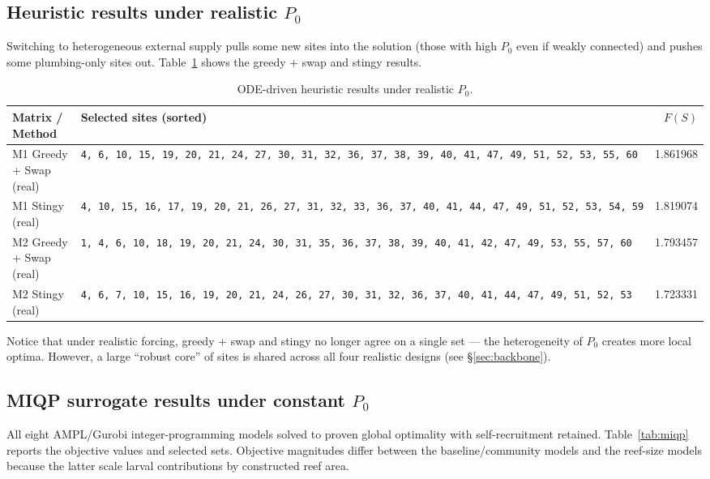 \documentclass[11pt]{article}
\begin{document}
\subsection{Heuristic results under realistic \texorpdfstring{$P_0$}{P0}}

Switching to heterogeneous external supply pulls some new sites into the solution (those with high $P_0$ even if weakly connected) and pushes some plumbing-only sites out. Table~\ref{tab:heur-real} shows the greedy + swap and stingy results.

\begin{table}[H]
\centering
\caption{ODE-driven heuristic results under realistic $P_0$.}
\label{tab:heur-real}
\small
\begin{tabularx}{\linewidth}{@{}l X r@{}}
\toprule
\textbf{Matrix / Method} & \textbf{Selected sites (sorted)} & \textbf{$F(S)$} \\
\midrule
M1 Greedy + Swap (real) & \texttt{4,\ 6,\ 10,\ 15,\ 19,\ 20,\ 21,\ 24,\ 27,\ 30,\ 31,\ 32,\ 36,\ 37,\ 38,\ 39,\ 40,\ 41,\ 47,\ 49,\ 51,\ 52,\ 53,\ 55,\ 60} & 1.861968 \\
M1 Stingy (real) & \texttt{4,\ 10,\ 15,\ 16,\ 17,\ 19,\ 20,\ 21,\ 26,\ 27,\ 31,\ 32,\ 33,\ 36,\ 37,\ 40,\ 41,\ 44,\ 47,\ 49,\ 51,\ 52,\ 53,\ 54,\ 59} & 1.819074 \\
\midrule
M2 Greedy + Swap (real) & \texttt{1,\ 4,\ 6,\ 10,\ 18,\ 19,\ 20,\ 21,\ 24,\ 30,\ 31,\ 35,\ 36,\ 37,\ 38,\ 39,\ 40,\ 41,\ 42,\ 47,\ 49,\ 53,\ 55,\ 57,\ 60} & 1.793457 \\
M2 Stingy (real) & \texttt{4,\ 6,\ 7,\ 10,\ 15,\ 16,\ 19,\ 20,\ 21,\ 24,\ 26,\ 27,\ 30,\ 31,\ 32,\ 36,\ 37,\ 40,\ 41,\ 44,\ 47,\ 49,\ 51,\ 52,\ 53} & 1.723331 \\
\bottomrule
\end{tabularx}
\end{table}

Notice that under realistic forcing, greedy + swap and stingy no longer agree on a single set --- the heterogeneity of $P_0$ creates more local optima. However, a large ``robust core'' of sites is shared across all four realistic designs (see \S\ref{sec:backbone}).

\subsection{MIQP surrogate results under constant \texorpdfstring{$P_0$}{P0}}

All eight AMPL/Gurobi integer-programming models solved to proven global optimality with self-recruitment retained. Table~\ref{tab:miqp} reports the objective values and selected sets. Objective magnitudes differ between the baseline/community models and the reef-size models because the latter scale larval contributions by constructed reef area.
\end{document}
